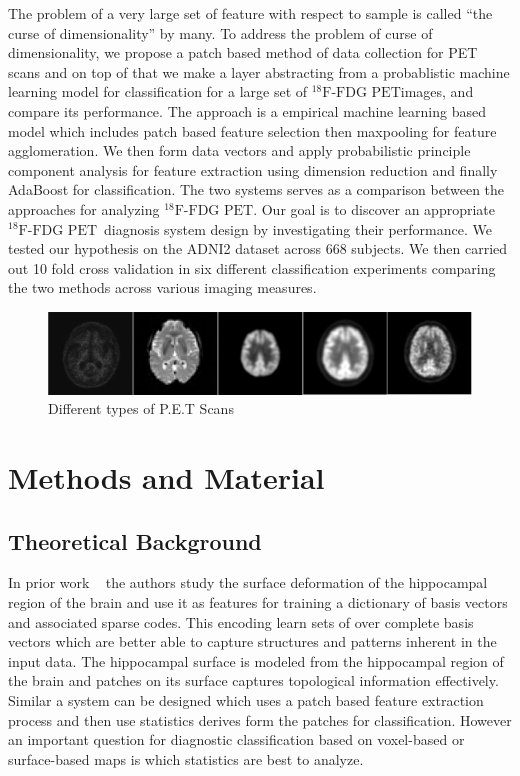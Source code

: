 \documentclass[authoryear,preprint,revi	ew,12pt]{elsarticle}
\newcommand{\FDGPET}   {$ ^{18}\textrm{F-FDG PET} $}
\begin{document}
The problem of a very large set of feature with respect to sample is called ``the curse of dimensionality'' by many. To address the problem of curse of dimensionality, we propose a patch based method of data collection for PET scans and on top of that we make a layer abstracting from a probablistic machine learning model for classification for a large set of \FDGPET images, and compare its performance. The approach is a empirical machine learning based model which includes patch based feature selection then maxpooling \citep{boureau2010theoretical} for feature agglomeration. We then form data vectors and apply probabilistic principle component analysis for feature extraction using dimension reduction and finally AdaBoost \citep{rojas2009adaboost} for classification. The two systems serves as a comparison between the approaches for analyzing \FDGPET. Our goal is to discover an appropriate \FDGPET ~diagnosis system design by investigating their performance. We tested our hypothesis on the ADNI2 dataset across $668$ subjects. We then carried out 10 fold cross validation in six different classification experiments comparing the two methods across various imaging measures.

\begin{figure}[h]
	\centering
	\includegraphics[width=\linewidth]{figures/pet_raw.png}
	\caption{Different types of P.E.T Scans}
	\label{fig:pet_raw}
\end{figure}	
	
\section{Methods and Material}

\subsection{Theoretical Background}
\label{subsec:theoritical_background}

In prior work ~\cite{zhang2016applying} the authors study the surface deformation of the hippocampal region of the brain and use it as features for training a dictionary of basis vectors and associated sparse codes. This encoding learn sets of over complete basis vectors which are better able to capture structures and patterns inherent in the input data. The hippocampal surface is modeled from the hippocampal region of the brain and patches on its surface captures topological information effectively. Similar a system can be designed which uses a patch based feature extraction process and then use statistics derives form the patches for classification. However an important question for diagnostic classification based on voxel-based or surface-based maps is which statistics are best to analyze. 
\end{document}

